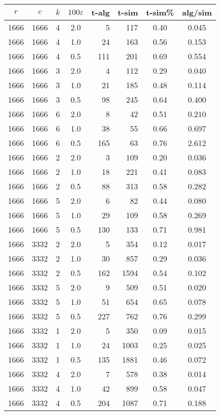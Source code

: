 \documentclass[11pt]{svjour3} \usepackage{fullpage}
\newcommand{\eps}{\varepsilon}
\begin{document}
{\begin{tabular}[t]{@{}|c@{~~}c@{~~}c@{~}c@{~}r@{~}r@{~}c@{~}c|} \hline
$r$	& $c$	& $k$	& $100\eps$	& t-alg	& t-sim	& t-sim\% & alg/sim \\ \hline
 1666 & 1666 & 4 & 2.0 & 5 & 117 & 0.40 & 0.045
\\ 1666 & 1666 & 4 & 1.0 & 24 & 163 & 0.56 & 0.153
\\ 1666 & 1666 & 4 & 0.5 & 111 & 201 & 0.69 & 0.554
\\ 1666 & 1666 & 3 & 2.0 & 4 & 112 & 0.29 & 0.040
\\ 1666 & 1666 & 3 & 1.0 & 21 & 185 & 0.48 & 0.114
\\ 1666 & 1666 & 3 & 0.5 & 98 & 245 & 0.64 & 0.400
\\ 1666 & 1666 & 6 & 2.0 & 8 & 42 & 0.51 & 0.210
\\ 1666 & 1666 & 6 & 1.0 & 38 & 55 & 0.66 & 0.697
\\ 1666 & 1666 & 6 & 0.5 & 165 & 63 & 0.76 & 2.612
\\ 1666 & 1666 & 2 & 2.0 & 3 & 109 & 0.20 & 0.036
\\ 1666 & 1666 & 2 & 1.0 & 18 & 221 & 0.41 & 0.083
\\ 1666 & 1666 & 2 & 0.5 & 88 & 313 & 0.58 & 0.282
\\ 1666 & 1666 & 5 & 2.0 & 6 & 82 & 0.44 & 0.080
\\ 1666 & 1666 & 5 & 1.0 & 29 & 109 & 0.58 & 0.269
\\ 1666 & 1666 & 5 & 0.5 & 130 & 133 & 0.71 & 0.981
\\ 1666 & 3332 & 2 & 2.0 & 5 & 354 & 0.12 & 0.017
\\ 1666 & 3332 & 2 & 1.0 & 30 & 857 & 0.29 & 0.036
\\ 1666 & 3332 & 2 & 0.5 & 162 & 1594 & 0.54 & 0.102
\\ 1666 & 3332 & 5 & 2.0 & 9 & 509 & 0.51 & 0.020
\\ 1666 & 3332 & 5 & 1.0 & 51 & 654 & 0.65 & 0.078
\\ 1666 & 3332 & 5 & 0.5 & 227 & 762 & 0.76 & 0.299
\\ 1666 & 3332 & 1 & 2.0 & 5 & 350 & 0.09 & 0.015
\\ 1666 & 3332 & 1 & 1.0 & 24 & 1003 & 0.25 & 0.025
\\ 1666 & 3332 & 1 & 0.5 & 135 & 1881 & 0.46 & 0.072
\\ 1666 & 3332 & 4 & 2.0 & 7 & 578 & 0.38 & 0.014
\\ 1666 & 3332 & 4 & 1.0 & 42 & 899 & 0.58 & 0.047
\\ 1666 & 3332 & 4 & 0.5 & 204 & 1087 & 0.71 & 0.188

\end{tabular}}
\end{document}
